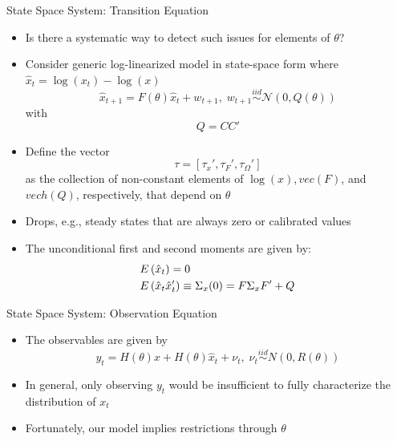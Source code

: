 \renewcommand{\Source}{\textcite{Iskrev2010}}
\begin{frame}{State Space System: Transition Equation}
\begin{itemize}
\item Is there a systematic way to detect such issues for elements of $\theta$?
\item Consider generic log-linearized model in state-space form where $\hat x_t=\log(x_t)-\log(x)$
\begin{equation}
  \hat x_{t + 1} = F(\theta) \hat x_t + w_{t + 1},\; w_{t + 1}\mathop  \sim \limits^{iid} \mathcal{N}\left(0,Q(\theta)\right)
\end{equation}
with
\[
Q=CC'
\]
\item Define the vector
\begin{equation}
\tau=\left[\tau_x',\tau_F',\tau_\Omega' \right]
\end{equation}
as the collection of non-constant elements of $\log(x),vec(F)$, and $vech(Q)$, respectively, that depend on $\theta$
\item Drops, e.g., steady states that are always zero or calibrated values
\item The unconditional first and second moments are given by:
\[\begin{gathered}
  E\left( {{{\hat x}_t}} \right) = 0 \hfill \\
  E\left( {{{\hat x}_t}{{\hat x}_t}'} \right) \equiv {\Sigma _x(0)} = F{\Sigma _x}F' + Q \hfill \\
\end{gathered} \]
\end{itemize}
\end{frame}

\begin{frame}{State Space System: Observation Equation}
\begin{itemize}
\item The observables are given by
\begin{equation}
  y_t = H(\theta)x + H(\theta)\hat x_t + \nu_t, \; \nu _t\mathop  \sim \limits^{iid} N\left(0,R(\theta) \right)
\end{equation}
\item In general, only observing $y_t$ would be insufficient to fully characterize the distribution of $x_t$
\item Fortunately, our model implies restrictions through $\theta$
\end{itemize}
\end{frame}


